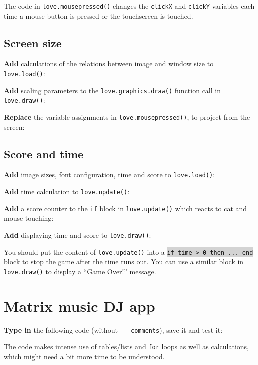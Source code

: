 \documentclass[a4paper, 11pt]{article}
\begin{document}
The code in \texttt{love.mousepressed()} changes the \texttt{clickX} and \texttt{clickY} variables each time a mouse button is pressed or the touchscreen is touched.

\newpage

\subsection{Screen size}

\textbf{Add} calculations of the relations between image and window size to \texttt{love.load()}:



\textbf{Add} scaling parameters to the \texttt{love.graphics.draw()} function call in \texttt{love.draw()}:



\textbf{Replace} the variable assignments in \texttt{love.mousepressed()}, to project from the screen:



\subsection{Score and time}

\textbf{Add} image sizes, font configuration, time and score to \texttt{love.load()}:



\textbf{Add} time calculation to \texttt{love.update()}:



\textbf{Add} a score counter to the \texttt{if} block in \texttt{love.update()} which reacts to cat and mouse touching:



\textbf{Add} displaying time and score to \texttt{love.draw()}:



You should put the content of \texttt{love.update()} into a \colorbox{lightgray}{\texttt{if time > 0 then ... end}} block to stop the game after the time runs out. You can use a similar block in \texttt{love.draw()} to display a ``Game Over!'' message.

\newpage

\section{Matrix music DJ app}

\textbf{Type in} the following code (without \texttt{-{}- comments}), save it and test it:



The code makes intense use of tables/lists and \texttt{for} loops as well as calculations, which might need a bit more time to be understood.
\end{document}
